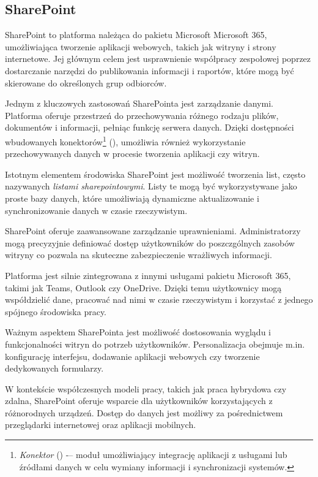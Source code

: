 \subsection{SharePoint}
SharePoint to platforma należąca do pakietu Microsoft Microsoft 365, umożliwiająca tworzenie aplikacji webowych, takich jak witryny i strony internetowe. Jej głównym celem jest usprawnienie współpracy zespołowej poprzez dostarczanie narzędzi do publikowania informacji i raportów, które mogą być skierowane do określonych grup odbiorców. \par
Jednym z kluczowych zastosowań SharePointa jest zarządzanie danymi. Platforma oferuje przestrzeń do przechowywania różnego rodzaju plików, dokumentów i informacji, pełniąc funkcję serwera danych. Dzięki dostępności wbudowanych konektorów\footnote{\emph{Konektor} () -– moduł umożliwiający integrację aplikacji z usługami lub źródłami danych w celu wymiany informacji i synchronizacji systemów.} (), umożliwia również wykorzystanie przechowywanych danych w procesie tworzenia aplikacji czy witryn. \par
Istotnym elementem środowiska SharePoint jest możliwość tworzenia list, często nazywanych \emph{listami sharepointowymi}. Listy te mogą być wykorzystywane jako proste bazy danych, które umożliwiają dynamiczne aktualizowanie i synchronizowanie danych w czasie rzeczywistym. \par
SharePoint oferuje zaawansowane zarządzanie uprawnieniami. Administratorzy mogą precyzyjnie definiować dostęp użytkowników do poszczgólnych zasobów witryny co pozwala na skuteczne zabezpieczenie wrażliwych informacji. \par
Platforma jest silnie zintegrowana z innymi usługami pakietu Microsoft 365, takimi jak Teams, Outlook czy OneDrive. Dzięki temu użytkownicy mogą współdzielić dane, pracować nad nimi w czasie rzeczywistym i korzystać z jednego spójnego środowiska pracy. \par
Ważnym aspektem SharePointa jest możliwość dostosowania wyglądu i funkcjonalności witryn do potrzeb użytkowników. Personalizacja obejmuje m.in. konfigurację interfejsu, dodawanie aplikacji webowych czy tworzenie dedykowanych formularzy. \par
W kontekście współczesnych modeli pracy, takich jak praca hybrydowa czy zdalna, SharePoint oferuje wsparcie dla użytkowników korzystających z różnorodnych urządzeń. Dostęp do danych jest możliwy za pośrednictwem przeglądarki internetowej oraz aplikacji mobilnych.

